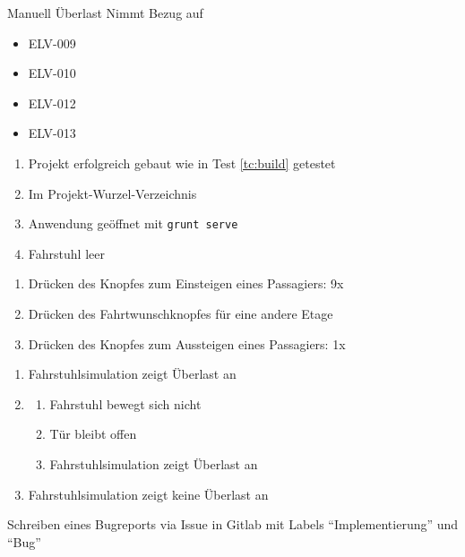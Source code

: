 \begin{testcase}{Manuell}
\tcSubject Überlast
\tcRemark Nimmt Bezug auf
	\begin{itemize}
	\item ELV-009
	\item ELV-010
	\item ELV-012
	\item ELV-013
	\end{itemize}
\tcConditions
	\begin{enumerate}
	\item Projekt erfolgreich gebaut wie in Test \ref{tc:build} getestet
	\item Im Projekt-Wurzel-Verzeichnis
	\item Anwendung geöffnet mit \texttt{grunt serve}
	\item Fahrstuhl leer
	\end{enumerate}
\tcProceeding
	\begin{enumerate}
	\item Drücken des Knopfes zum Einsteigen eines Passagiers: 9x
	\item Drücken des Fahrtwunschknopfes für eine andere Etage
	\item Drücken des Knopfes zum Aussteigen eines Passagiers: 1x
	\end{enumerate}
\tcGoal
	\begin{enumerate}
	\item Fahrstuhlsimulation zeigt Überlast an
		\item
		\begin{enumerate}
		\item Fahrstuhl bewegt sich nicht
		\item Tür bleibt offen
		\item Fahrstuhlsimulation zeigt Überlast an
		\end{enumerate}
	\item Fahrstuhlsimulation zeigt keine Überlast an
	\end{enumerate}
\tcError Schreiben eines Bugreports via Issue in Gitlab mit Labels "`Implementierung"' und "`Bug"'
\end{testcase}

